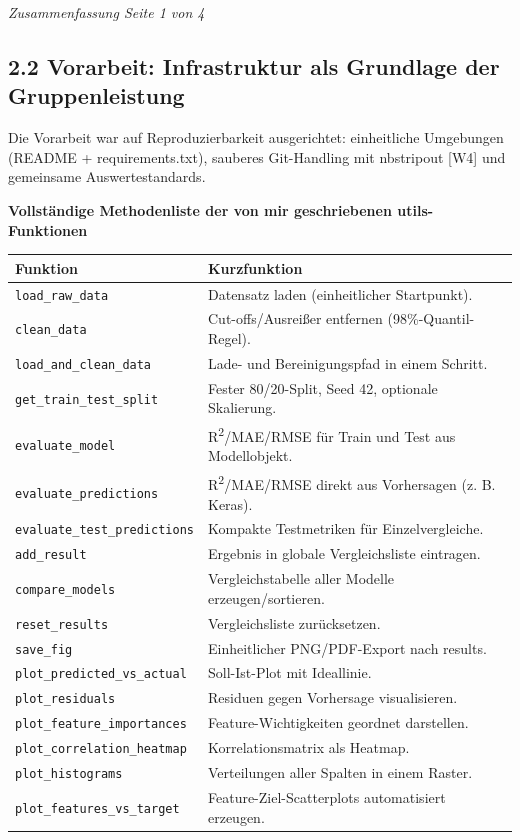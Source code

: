 \documentclass[11pt,a4paper,ngerman,openany]{report}
\begin{document}
\vfill
\begin{flushright}
\textit{Zusammenfassung Seite 1 von 4}
\end{flushright}
\newpage

\subsection*{2.2 Vorarbeit: Infrastruktur als Grundlage der Gruppenleistung}
Die Vorarbeit war auf Reproduzierbarkeit ausgerichtet: einheitliche Umgebungen (README + requirements.txt), sauberes Git-Handling mit nbstripout [W4] und gemeinsame Auswertestandards.

\textbf{Vollst\"andige Methodenliste der von mir geschriebenen utils-Funktionen}

\small
\begin{tabularx}{\textwidth}{>{\raggedright\arraybackslash}p{3.8cm}X}
\toprule
\textbf{Funktion} & \textbf{Kurzfunktion} \\
\midrule
\texttt{load\_raw\_data} & Datensatz laden (einheitlicher Startpunkt). \\
\texttt{clean\_data} & Cut-offs/Ausrei\ss{}er entfernen (98\%-Quantil-Regel). \\
\texttt{load\_and\_clean\_data} & Lade- und Bereinigungspfad in einem Schritt. \\
\texttt{get\_train\_test\_split} & Fester 80/20-Split, Seed 42, optionale Skalierung. \\
\texttt{evaluate\_model} & R\textsuperscript{2}/MAE/RMSE f\"ur Train und Test aus Modellobjekt. \\
\texttt{evaluate\_predictions} & R\textsuperscript{2}/MAE/RMSE direkt aus Vorhersagen (z. B. Keras). \\
\texttt{evaluate\_test\_predictions} & Kompakte Testmetriken f\"ur Einzelvergleiche. \\
\texttt{add\_result} & Ergebnis in globale Vergleichsliste eintragen. \\
\texttt{compare\_models} & Vergleichstabelle aller Modelle erzeugen/sortieren. \\
\texttt{reset\_results} & Vergleichsliste zur\"ucksetzen. \\
\texttt{save\_fig} & Einheitlicher PNG/PDF-Export nach results. \\
\texttt{plot\_predicted\_vs\_actual} & Soll-Ist-Plot mit Ideallinie. \\
\texttt{plot\_residuals} & Residuen gegen Vorhersage visualisieren. \\
\texttt{plot\_feature\_importances} & Feature-Wichtigkeiten geordnet darstellen. \\
\texttt{plot\_correlation\_heatmap} & Korrelationsmatrix als Heatmap. \\
\texttt{plot\_histograms} & Verteilungen aller Spalten in einem Raster. \\
\texttt{plot\_features\_vs\_target} & Feature-Ziel-Scatterplots automatisiert erzeugen. \\
\bottomrule
\end{tabularx}
\normalsize
\end{document}
